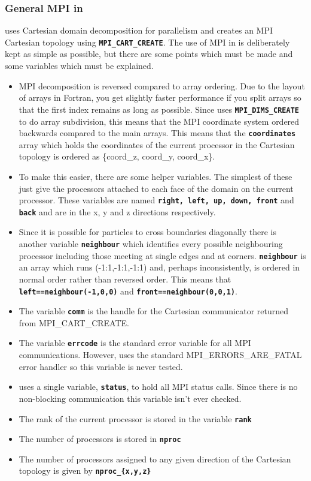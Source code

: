 \documentclass[12pt,a4paper]{article}
\newcommand{\inlinecode}[1]{{\color{warwickred} \bf\texttt{#1}}}
\newcommand{\EPOCH}{{\color{warwickdark}\fontfamily{phv}\selectfont{EPOCH}}}
\begin{document}
\subsubsection{General MPI in {\EPOCH}}
{\EPOCH} uses Cartesian domain decomposition for parallelism and creates an MPI
Cartesian topology using \inlinecode{MPI\_CART\_CREATE}.  The use of MPI in
{\EPOCH} is deliberately kept as simple as possible, but there are some points
which must be made and some variables which must be explained.
\begin{itemize}
\item MPI decomposition is reversed compared to array ordering. Due to the
  layout of arrays in Fortran, you get slightly faster performance if you split
  arrays so that the first index remains as long as possible. Since {\EPOCH} uses
  \inlinecode{MPI\_DIMS\_CREATE} to do array subdivision, this means that the
  MPI coordinate system ordered backwards compared to the main arrays. This
  means that the \inlinecode{coordinates} array which holds the coordinates of
  the current processor in the Cartesian topology is ordered as \{coord\_z,
  coord\_y, coord\_x\}.
\item To make this easier, there are some helper variables. The simplest of
  these just give the processors attached to each face of the domain on the
  current processor. These variables are named \inlinecode{right, left, up,
    down, front} and \inlinecode{back} and are in the x, y and z directions
  respectively.
\item Since it is possible for particles to cross boundaries diagonally there
  is another variable \inlinecode{neighbour} which identifies every possible
  neighbouring processor including those meeting at single edges and at
  corners. \inlinecode{neighbour} is an array which runs (-1:1,-1:1,-1:1) and,
  perhaps inconsistently, is ordered in normal order rather than reversed
  order. This means that \inlinecode{left==neighbour(-1,0,0)} and
  \inlinecode{front==neighbour(0,0,1)}.
\item The variable \inlinecode{comm} is the handle for the Cartesian
  communicator returned from MPI\_CART\_CREATE.
\item The variable \inlinecode{errcode} is the standard error variable for all
  MPI communications. However, {\EPOCH} uses the standard MPI\_ERRORS\_ARE\_FATAL
  error handler so this variable is never tested.
\item {\EPOCH} uses a single variable, \inlinecode{status}, to hold all MPI
  status calls. Since there is no non-blocking communication this variable
  isn't ever checked.
\item The rank of the current processor is stored in the variable
  \inlinecode{rank}
\item The number of processors is stored in \inlinecode{nproc}
\item The number of processors assigned to any given direction of the Cartesian
  topology is given by \inlinecode{nproc\_\{x,y,z\}}
\end{itemize}
\end{document}
